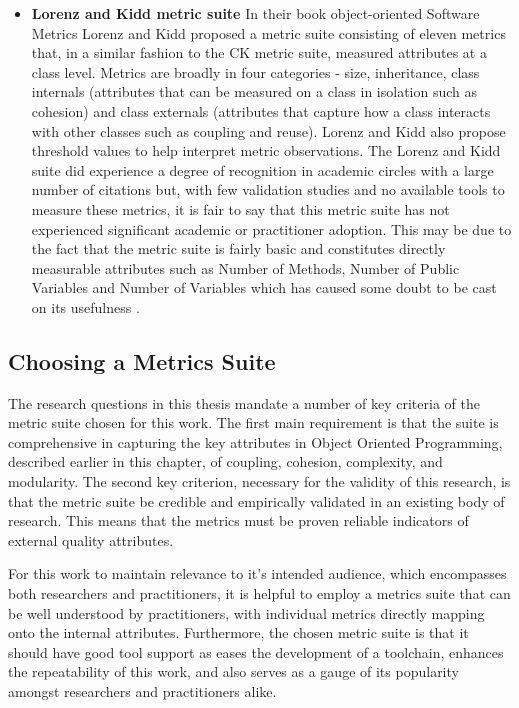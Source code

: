 \begin{itemize}
\item \textbf{Lorenz and Kidd metric suite} In their book object-oriented Software Metrics \cite{lorenz1994object} Lorenz and Kidd proposed a metric suite consisting of eleven metrics that, in a similar fashion to the CK metric suite, measured attributes at a class level. Metrics are broadly in four categories - size, inheritance, class internals (attributes that can be measured on a class in isolation such as cohesion) and class externals (attributes that capture how a class interacts with other classes such as coupling and reuse). Lorenz and Kidd also propose threshold values to help interpret metric observations. The Lorenz and Kidd suite did experience a degree of recognition in academic circles with a large number of citations \cite{nesi1998effort} but, with few validation studies \cite{sharma2012metrics} and no available tools to measure these metrics, it is fair to say that this metric suite has not experienced significant academic or practitioner adoption. This may be due to the fact that the metric suite is fairly basic and constitutes directly measurable attributes such as Number of Methods, Number of Public Variables and Number of Variables which has caused some doubt to be cast on its usefulness \cite{harrison1998investigation}.
\end{itemize}

\subsection{Choosing a Metrics Suite} The research questions in this thesis mandate a number of key criteria of the metric suite chosen for this work. The first main requirement is that the suite is comprehensive in capturing the key attributes in Object Oriented Programming, described earlier in this chapter, of coupling, cohesion, complexity, and modularity. The second key criterion, necessary for the validity of this research, is that the metric suite be credible and empirically validated in an existing body of research. This means that the metrics must be proven reliable indicators of external quality attributes.

For this work to maintain relevance to it's intended audience, which encompasses both researchers and practitioners, it is helpful to employ a metrics suite that can be well understood by practitioners, with individual metrics directly mapping onto the internal attributes. Furthermore, the chosen metric suite is that it should have good tool support as eases the development of a toolchain, enhances the repeatability of this work, and also serves as a gauge of its popularity amongst researchers and practitioners alike. 

